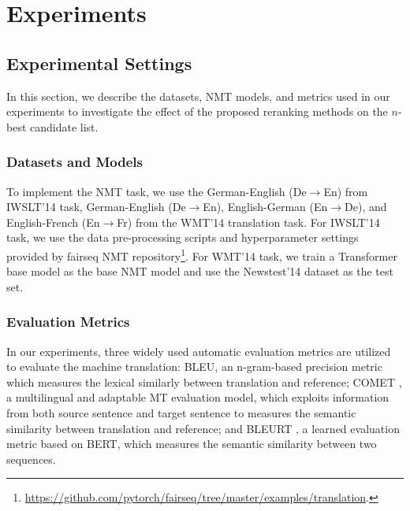 \documentclass{article}
\begin{document}
\section{Experiments}
\subsection{Experimental Settings}
In this section, we describe the datasets, NMT models, and metrics used in our experiments to investigate the effect of the proposed reranking methods on the $n$-best candidate list. 
\subsubsection{Datasets and Models}
To implement the NMT task, we use the German-English (De$\to$En) from IWSLT’14 task, German-English (De$\to$En), English-German (En$\to$De), and English-French (En$\to$Fr) from the WMT’14 translation task. For IWSLT’14 task, we use the data pre-processing scripts and hyperparameter settings provided by fairseq NMT repository\footnote{ \url{https://github.com/pytorch/fairseq/tree/master/examples/translation}.}. For WMT’14 task, we train a Transformer base model \cite{48} as the base NMT model and use the Newstest’14 dataset as the test set.
\subsubsection{Evaluation Metrics}
In our experiments, three widely used automatic evaluation metrics are utilized to evaluate the machine translation: BLEU, an n-gram-based precision metric which measures the lexical similarly between translation and reference; COMET \cite{27}, a multilingual and adaptable MT evaluation model, which exploits information from both source sentence and target sentence to measures the semantic similarity between translation and reference; and BLEURT \cite{28}, a learned evaluation metric based on BERT, which measures the semantic similarity between two sequences.
\end{document}
